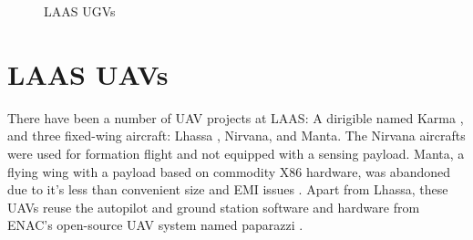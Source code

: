 \documentclass[a4paper,11pt]{report}
\begin{document}
\begin{figure}[htb]
  \centering
  \caption{LAAS UGVs}
  \label{fig:ugvs}
\end{figure}

\vspace{1cm}

\section{LAAS UAVs}

There have been a number of UAV projects at LAAS: A dirigible named Karma \cite{karma}, and three fixed-wing aircraft: Lhassa \cite{lhassa}, Nirvana, and Manta. The Nirvana aircrafts were used for formation flight \cite{gautier} and not equipped with a sensing payload. Manta, a flying wing with a payload based on commodity X86 hardware, was abandoned due to it's less than convenient size and EMI issues \cite{manta}. Apart from Lhassa, these UAVs reuse the autopilot and ground station software and hardware from ENAC's open-source UAV system named paparazzi \cite{paparazzi}.
\end{document}
